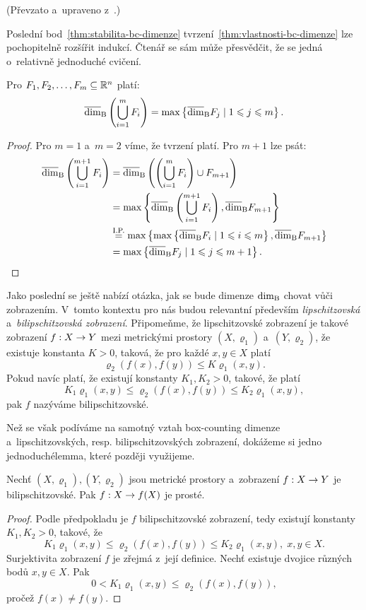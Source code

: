 (Převzato a~upraveno z~\citep[str. 35]{Falconer2014}.)

Poslední bod~\ref{thm:stabilita-bc-dimenze} tvrzení~\ref{thm:vlastnosti-bc-dimenze} lze pochopitelně rozšířit indukcí. Čtenář se sám může přesvědčit, že se jedná o~relativně jednoduché cvičení.
\begin{corollary}\label{cor:stabilita-bc-dimenze-obecne}
    Pro $F_1,F_2,\ldots,F_m\subseteq\mathbb{R}^n$ platí:
    \[\overline{\dim}_\textup{B}\left(\bigcup_{i=1}^m F_i\right)=\max\left\{\overline{\dim}_\textup{B}{F_j}\mid 1\leqslant j\leqslant m\right\}.\]
\end{corollary}
\begin{proof}
    Pro $m=1$ a~$m=2$ víme, že tvrzení platí. Pro $m+1$ lze psát:
    \begin{align*}
        \overline{\dim}_\textup{B}\left(\bigcup_{i=1}^{m+1}F_i\right)&=\overline{\dim}_\textup{B}\left(\left(\bigcup_{i=1}^{m}F_i\right)\cup F_{m+1}\right)\\
        &=\max\left\{\overline{\dim}_\textup{B}\left(\bigcup_{i=1}^{m+1}F_i\right),\overline{\dim}_\textup{B}{F_{m+1}}\right\}\\
        &\stackrel{\text{I.P.}}{=}\max\left\{\max\left\{\overline{\dim}_\textup{B}{F_i}\mid 1\leqslant i\leqslant m\right\},\overline{\dim}_\textup{B}{F_{m+1}}\right\}\\
        &=\max\left\{\overline{\dim}_\textup{B}{F_j}\mid 1\leqslant j\leqslant m+1\right\}.
    \end{align*}
\end{proof}

Jako poslední se ještě nabízí otázka, jak se bude dimenze $\operatorname{dim_B}$ chovat vůči zobrazením. V~tomto kontextu pro nás budou relevantní především \emph{lipschitzovská} a~\emph{bilipschitzovská zobrazení}. Připomeňme, že lipschitzovské zobrazení je takové zobrazení $f:X \rightarrow Y$ mezi metrickými prostory $(X,\varrho_1)$ a~$(Y,\varrho_2)$, že existuje konstanta $K>0$, taková, že pro každé $x,y\in X$ platí
\[\varrho_2(f(x),f(y))\leqslant K\varrho_1(x,y).\]
Pokud navíc platí, že existují konstanty $K_1,K_2>0$, takové, že platí
\[K_1\varrho_1(x,y)\leqslant\varrho_2(f(x),f(y))\leqslant K_2\varrho_1(x,y),\]
pak $f$ nazýváme bilipschitzovské.

Než se však podíváme na samotný vztah box-counting dimenze a~lipschitzovských, resp. bilipschitzovských zobrazení, dokážeme si jedno jednoduché\linebreak{}lemma, které později využijeme.
\begin{lemma}\label{lem:lipschitzovska-zobrazeni-a-bijekce}
    Nechť $(X,\varrho_1),(Y,\varrho_2)$ jsou metrické prostory a~zobrazení $f:X \rightarrow Y$ je bilipschitzovské. Pak $f:X \rightarrow f(X)$ je prosté.
\end{lemma}
\begin{proof}
    Podle předpokladu je $f$ bilipschitzovské zobrazení, tedy existují konstanty $K_1,K_2>0$, takové, že
    \[K_1\varrho_1(x,y)\leqslant\varrho_2(f(x),f(y))\leqslant K_2\varrho_1(x,y),\;x,y\in X.\]
    Surjektivita zobrazení $f$ je zřejmá z~její definice. Nechť existuje dvojice různých bodů $x,y\in X$. Pak
    \[0<K_1\varrho_1(x,y)\leqslant\varrho_2(f(x),f(y)),\]
    pročež $f(x)\neq f(y)$.
\end{proof}

